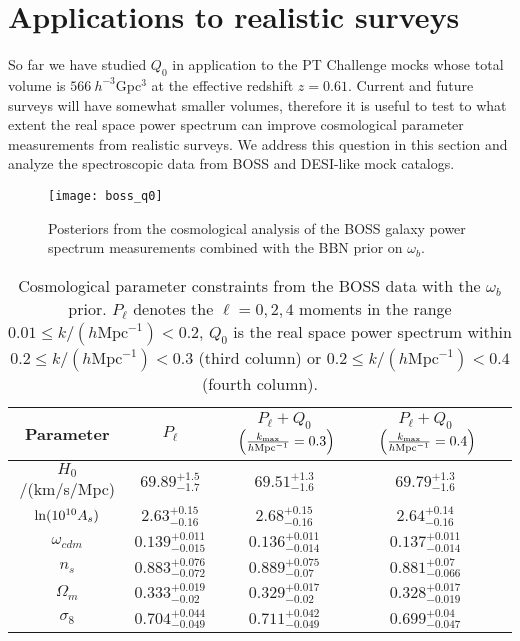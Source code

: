 \documentclass[12pt,a4paper]{article}
\newcommand\hMpc{h\text{Mpc}^{-1}}
\renewcommand{\ln}{\mathop{\rm ln}\nolimits}
\begin{document}
\section{Applications to realistic surveys}
\label{sec:boss}

So far we have studied $Q_0$ in application
to the PT Challenge mocks whose total volume is 
$566~h^{-3}$Gpc$^3$ at the effective redshift $z=0.61$.
Current and future surveys will have somewhat 
smaller volumes, therefore it is useful to test
to what extent the real space power spectrum can 
improve cosmological parameter measurements from 
realistic surveys. We address this question in this section
and analyze the spectroscopic data from BOSS
and DESI-like mock catalogs. 

\begin{figure}[ht!]
\centering
 \texttt{[image: boss\_q0]}
    \caption{
Posteriors from the cosmological analysis of the 
    BOSS galaxy power spectrum measurements
    combined
    with the BBN prior on $\omega_b$. 
    }
    \label{fig:boss}
\end{figure}
\begin{table*}[ht!]
\begin{center}
  \begin{tabular}{|c||c|c|c|c|} \hline
   Parameter   &  $P_{\ell}$
   &  
   $P_\ell+Q_0$
    $~\left(\frac{k_{\rm max}}{\hMpc}=0.3\right)$  
     &  
   $P_\ell+Q_0$
    $~\left(\frac{k_{\rm max}}{\hMpc}=0.4\right)$  
     \\ [0.2cm]
      \hline 
$H_0$/(km/s/Mpc)    & $69.89_{-1.7}^{+1.5}$
& $69.51_{-1.6}^{+1.3}$ 
& 
$69.79_{-1.6}^{+1.3}$
\\ \hline
$\ln(10^{10}A_s)$   & $2.63_{-0.16}^{+0.15}$
& $2.68_{-0.16}^{+0.15}  $ & $2.64_{-0.16}^{+0.14}$
\\ 
\hline
     $\omega_{cdm}$  &
$0.139_{-0.015}^{+0.011}$
  & $0.136_{-0.014}^{+0.011}  $ &
  $0.137_{-0.014}^{+0.011}$
   \\  \hline
     $n_s$  &
$0.883_{-0.072}^{+0.076}$
  & $0.889_{-0.07}^{+0.075}$
  & $0.881_{-0.066}^{+0.07}$
   \\  
   \hline \hline 
$\Omega_m$   & $0.333_{-0.02}^{+0.019}$
& $0.329_{-0.02}^{+0.017}$
& $0.328_{-0.019}^{+0.017}$
\\ \hline
$\sigma_8$   
& $0.704_{-0.049}^{+0.044}$
& $0.711_{-0.049}^{+0.042}$ 
&  $0.699_{-0.047}^{+0.04}$\\ 
\hline
\end{tabular}
\caption{Cosmological parameter constraints from the BOSS data with the $\omega_b$ prior. $P_\ell$ denotes the $\ell=0,2,4$
moments in the range $0.01 \leq k/(\hMpc)< 0.2$, $Q_0$
is the real space power spectrum within 
$0.2 \leq k/(\hMpc)< 0.3$ (third column)
or $0.2 \leq k/(\hMpc)< 0.4$ (fourth column).
}
\label{tab:boss}
\end{center}
\end{table*}
\end{document}

